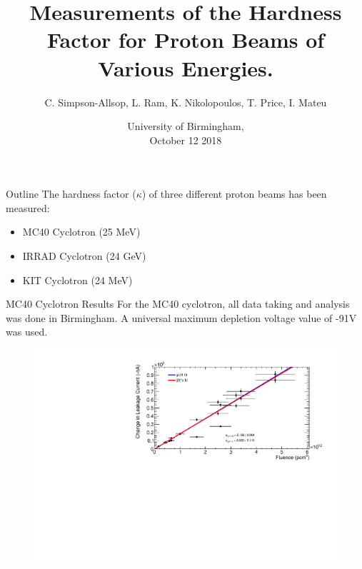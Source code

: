 \documentclass{beamer}
\title{Measurements of the Hardness Factor for Proton Beams of Various Energies.}
\author{C. Simpson-Allsop, L. Ram, K. Nikolopoulos, T. Price, I. Mateu \vspace{-1cm}}
\date{University of Birmingham, \\ \vspace{0.1cm} October 12 2018}
\begin{document}
    \begin{frame}
      \titlepage
    \end{frame}

    \begin{frame}{Outline}
    The hardness factor ($\kappa$) of three different proton beams has been measured:
      \begin{itemize}
          \item MC40 Cyclotron (25 MeV)
          \item IRRAD Cyclotron (24 GeV)
          \item KIT Cyclotron (24 MeV)
      \end{itemize}
    \end{frame}
    
    \begin{frame}{MC40 Cyclotron Results}
    For the MC40 cyclotron, all data taking and analysis was done in Birmingham. A universal maximum depletion voltage value of -91V was used.
    \begin{figure}
        \centering
        \includegraphics[width = 0.95\linewidth]{MC40.pdf}
    \end{figure}
    \end{frame}
    
\end{document}
